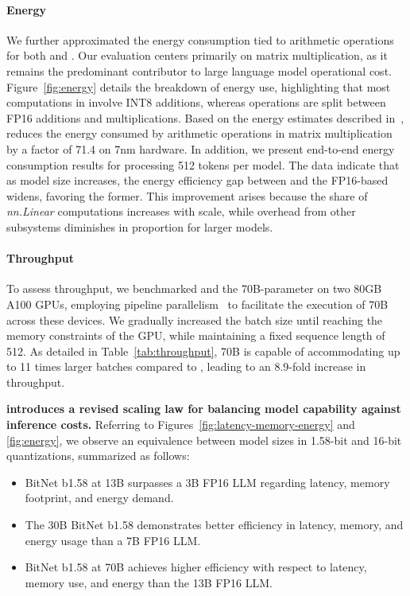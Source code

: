 \paragraph{Energy}

We further approximated the energy consumption tied to arithmetic operations for both  and . Our evaluation centers primarily on matrix multiplication, as it remains the predominant contributor to large language model operational cost. Figure~\ref{fig:energy} details the breakdown of energy use, highlighting that most computations in  involve INT8 additions, whereas  operations are split between FP16 additions and multiplications. Based on the energy estimates described in~\cite{energycost, pokebnn},  reduces the energy consumed by arithmetic operations in matrix multiplication by a factor of 71.4 on 7nm hardware. In addition, we present end-to-end energy consumption results for processing 512 tokens per model. The data indicate that as model size increases, the energy efficiency gap between  and the FP16-based  widens, favoring the former. This improvement arises because the share of \emph{nn.Linear} computations increases with scale, while overhead from other subsystems diminishes in proportion for larger models.

\paragraph{Throughput}

To assess throughput, we benchmarked  and the 70B-parameter  on two 80GB A100 GPUs, employing pipeline parallelism~\cite{gpipe} to facilitate the execution of  70B across these devices. We gradually increased the batch size until reaching the memory constraints of the GPU, while maintaining a fixed sequence length of 512. As detailed in Table~\ref{tab:throughput},  70B is capable of accommodating up to 11 times larger batches compared to , leading to an 8.9-fold increase in throughput.

\textbf{ introduces a revised scaling law for balancing model capability against inference costs.} Referring to Figures~\ref{fig:latency-memory-energy} and \ref{fig:energy}, we observe an equivalence between model sizes in 1.58-bit and 16-bit quantizations, summarized as follows:

\begin{itemize}
    \item BitNet b1.58 at 13B surpasses a 3B FP16 LLM regarding latency, memory footprint, and energy demand.
    \item The 30B BitNet b1.58 demonstrates better efficiency in latency, memory, and energy usage than a 7B FP16 LLM.
    \item BitNet b1.58 at 70B achieves higher efficiency with respect to latency, memory use, and energy than the 13B FP16 LLM.
\end{itemize}


